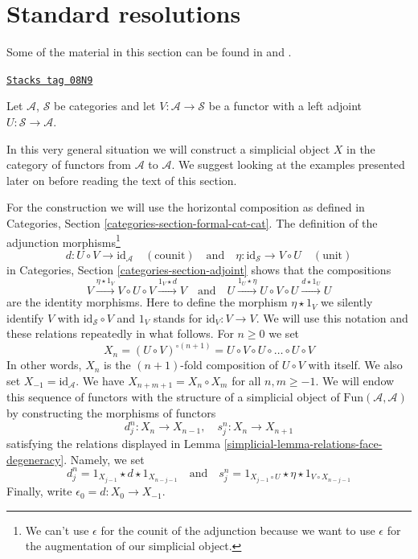 \section{Standard resolutions}
\label{simplicial-section-standard}
Some of the material in this section can be found in
\cite[Appendix 1]{Godement} and \cite[I 1.5]{cotangent}.

\begin{definition}
\label{simplicial-situation-adjoint-functors}
\href{https://stacks.math.columbia.edu/tag/08N9}{\texttt{Stacks tag 08N9}}

Let $\mathcal{A}$, $\mathcal{S}$ be categories and let
$V : \mathcal{A} \to \mathcal{S}$ be a functor with a left adjoint
$U : \mathcal{S} \to \mathcal{A}$.
\end{definition}

In this very general situation we will construct a simplicial
object $X$ in the category of functors from $\mathcal{A}$ to $\mathcal{A}$.
We suggest looking at the examples presented later on before reading
the text of this section.

\medskip\noindent
For the construction we will use the horizontal composition as
defined in Categories, Section \ref{categories-section-formal-cat-cat}.
The definition of the adjunction morphisms\footnote{We can't use
$\epsilon$ for the counit of the adjunction
because we want to use $\epsilon$ for the
augmentation of our simplicial object.}
$$
d : U \circ V \to \text{id}_\mathcal{A} \quad (\text{counit})
\quad\text{and}\quad
\eta : \text{id}_\mathcal{S} \to V \circ U \quad (\text{unit})
$$
in Categories, Section \ref{categories-section-adjoint}
shows that the compositions
\begin{equation}
\label{equation-composition}
V \xrightarrow{\eta \star 1_V} V \circ U \circ V \xrightarrow{1_V \star d} V
\quad\text{and}\quad
U \xrightarrow{1_U \star \eta} U \circ V \circ U \xrightarrow{d \star 1_U} U
\end{equation}
are the identity morphisms. Here to define the morphism $\eta \star 1_V$ we
silently identify $V$ with $\text{id}_\mathcal{S} \circ V$ and
$1_V$ stands for $\text{id}_V : V \to V$. We will use this notation and
these relations repeatedly in what follows.
For $n \geq 0$ we set
$$
X_n = (U \circ V)^{\circ (n + 1)} =
U \circ V \circ U \circ \ldots \circ U \circ V
$$
In other words, $X_n$ is the $(n + 1)$-fold composition of $U \circ V$
with itself. We also set $X_{-1} = \text{id}_\mathcal{A}$.
We have $X_{n + m + 1} = X_n \circ X_m$ for all $n, m \geq -1$.
We will endow this sequence of functors with the structure of a
simplicial object of $\text{Fun}(\mathcal{A}, \mathcal{A})$ by constructing
the morphisms of functors
$$
d^n_j : X_n \to X_{n - 1},\quad s^n_j : X_n \to X_{n + 1}
$$
satisfying the relations displayed in
Lemma \ref{simplicial-lemma-relations-face-degeneracy}.
Namely, we set
$$
d^n_j = 1_{X_{j - 1}} \star d \star 1_{X_{n - j - 1}}
\quad\text{and}\quad
s^n_j = 1_{X_{j - 1} \circ U} \star \eta \star 1_{V \circ X_{n - j - 1}}
$$
Finally, write $\epsilon_0 = d : X_0 \to X_{-1}$.


